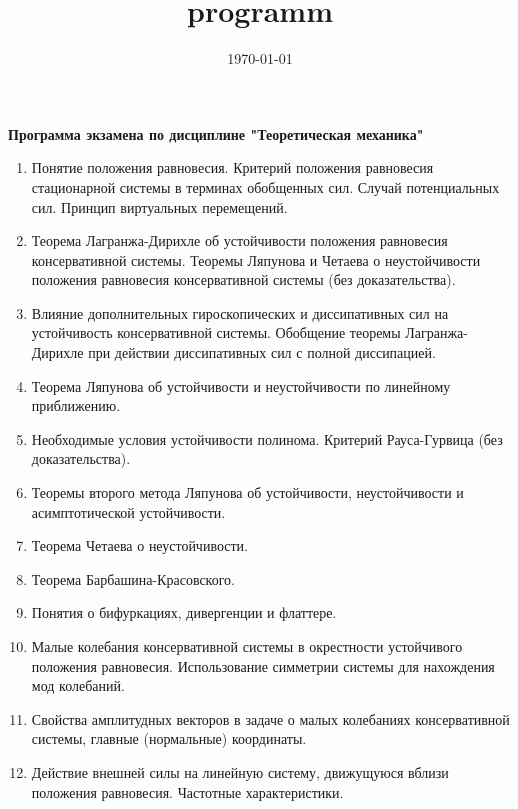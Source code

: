 \documentclass[a4paper,12pt]{article}
\title{programm}
\date{\today}
\begin{document}
	\begin{center}
		\large\textbf{Программа экзамена по дисциплине "Теоретическая механика"}
	\end{center}
	\begin{enumerate}
	\item Понятие положения равновесия. Критерий положения равновесия стационарной системы в терминах обобщенных сил. Случай потенциальных сил. Принцип  виртуальных перемещений.
	
	\item Теорема  Лагранжа-Дирихле  об  устойчивости положения равновесия консервативной  системы. Теоремы Ляпунова и Четаева о неустойчивости положения равновесия консервативной системы (без доказательства).
	
	\item Влияние дополнительных гироскопических и диссипативных сил на устойчивость консервативной системы. Обобщение теоремы Лагранжа-Дирихле при действии диссипативных сил с полной диссипацией.
	
	\item Теорема Ляпунова об устойчивости и неустойчивости по линейному приближению. 
	
	\item Необходимые условия устойчивости полинома. Критерий  Рауса-Гурвица (без доказательства).
	
	\item Теоремы второго метода Ляпунова об устойчивости, неустойчивости и асимптотической устойчивости.
	
	\item Теорема Четаева о неустойчивости.
	
	\item Теорема Барбашина-Красовского.
	
	\item Понятия о бифуркациях, дивергенции и флаттере. 
	
	\item Малые колебания консервативной системы в окрестности устойчивого положения  равновесия. Использование симметрии системы для нахождения мод колебаний.
	
	\item Свойства амплитудных векторов в задаче о малых колебаниях консервативной системы, главные (нормальные) координаты.
	
	\item Действие внешней силы на линейную систему, движущуюся вблизи положения равновесия. Частотные характеристики.
	

\end{enumerate}
\end{document}
